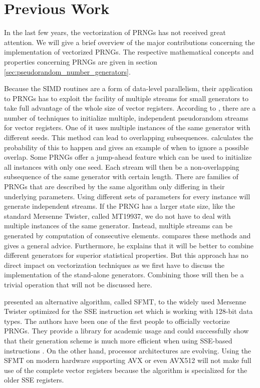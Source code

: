 \documentclass{stdlocal}
\begin{document}
\section{Previous Work} %
\label{sec:previous_work}
  In the last few years, the vectorization of PRNGs has not received great attention.
  We will give a brief overview of the major contributions concerning the implementation of vectorized PRNGs.
  The respective mathematical concepts and properties concerning PRNGs are given in section \ref{sec:pseudorandom_number_generators}.

  Because the SIMD routines are a form of data-level parallelism, their application to PRNGs has to exploit the facility of multiple streams for small generators to take full advantage of the whole size of vector registers.
  According to \textcite{fog2015}, there are a number of techniques to initialize multiple, independent pseudorandom streams for vector registers.
  One of it uses multiple instances of the same generator with different seeds.
  This method can lead to overlapping subsequences.
  \citeauthor{fog2015} calculates the probability of this to happen and gives an example of when to ignore a possible overlap.
  Some PRNGs offer a jump-ahead feature which can be used to initialize all instances with only one seed.
  Each stream will then be a non-overlapping subsequence of the same generator with certain length.
  There are families of PRNGs that are described by the same algorithm only differing in their underlying parameters.
  Using different sets of parameters for every instance will generate independent streams.
  If the PRNG has a larger state size, like the standard Mersenne Twister, called MT19937, we do not have to deal with multiple instances of the same generator.
  Instead, multiple streams can be generated by computation of consecutive elements.
  \citeauthor{fog2015} compares these methods and gives a general advice.
  Furthermore, he explains that it will be better to combine different generators for superior statistical properties.
  But this approach has no direct impact on vectorization techniques as we first have to discuss the implementation of the stand-alone generators.
  Combining those will then be a trivial operation that will not be discussed here.

  \textcite{saito2008} presented an alternative algorithm, called SFMT, to the widely used Mersenne Twister optimized for the SSE instruction set which is working with 128-bit data types.
  The authors have been one of the first people to officially vectorize PRNGs.
  They provide a library for academic usage and could successfully show that their generation scheme is much more efficient when using SSE-based instructions \autocite{sfmt}.
  On the other hand, processor architectures are evolving.
  Using the SFMT on modern hardware supporting AVX or even AVX512 will not make full use of the complete vector registers because the algorithm is specialized for the older SSE registers.
\end{document}
